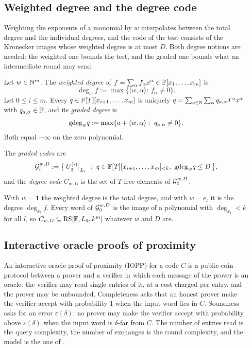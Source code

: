 \subsection{Weighted degree and the degree code}\label{sec:wdeg}

Weighting the exponents of a monomial by $w$ interpolates between the total degree and the
individual degrees, and the code of the test consists of the Kronecker images whose weighted
degree is at most $D$. Both degree notions are needed: the weighted one bounds the test, and
the graded one bounds what an intermediate round may send.

\begin{definition}\label{def:wdeg}
Let $w\in\mathbb{N}^m$. The \emph{weighted degree} of $f=\sum_\alpha f_\alpha x^\alpha\in\mathbb{F}[x_1,\dots,x_m]$ is
\[
\deg_w f:=\max\{\langle w,\alpha\rangle:\ f_\alpha\ne0\}.
\]
Let $0\le i\le m$. Every $q\in\mathbb{F}[T][x_{i+1},\dots,x_m]$ is uniquely
$q=\sum_{a\in\mathbb{N}}\sum_\alpha q_{a,\alpha}T^ax^\alpha$ with $q_{a,\alpha}\in\mathbb{F}$, and its
\emph{graded degree} is
\[
\mathrm{gdeg}_w q:=\max\{a+\langle w,\alpha\rangle:\ q_{a,\alpha}\ne0\}.
\]
Both equal $-\infty$ on the zero polynomial.
\end{definition}

\begin{definition}\label{def:graded}
The \emph{graded codes} are
\[
\Gc_i^{w,D}:=\big\{\,U^{(i)}_q\big|_{L_i}\ :\ q\in\F[T][x_{i+1},\dots,x_m]_{<k},\ \gdeg_w q\le D\,\big\},
\]
and the \emph{degree code} $C_{w,D}$ is the set of $T$-free elements of $\mathcal{G}_0^{w,D}$.
\end{definition}

With $w=\mathbf 1$ the weighted degree is the total degree, and with $w=e_l$ it is the
degree $\deg_{x_l}f$. Every word of $\mathcal{G}_0^{w,D}$ is the image of a polynomial with
$\deg_{x_l}<k$ for all $l$, so $C_{w,D}\subseteq\mathrm{RS}[\mathbb{F},L_0,k^m]$ whatever $w$ and $D$ are.

\subsection{Interactive oracle proofs of proximity}\label{sec:iop}

An interactive oracle proof of proximity (IOPP) for a code $C$ is a public-coin protocol
between a prover and a verifier in which each message of the prover is an oracle: the
verifier may read single entries of it, at a cost charged per entry, and the prover may be
unbounded. Completeness asks that an honest prover make the verifier accept with probability
$1$ when the input word lies in $C$. Soundness asks for an error $\varepsilon(\delta)$: no
prover may make the verifier accept with probability above $\varepsilon(\delta)$ when the input
word is $\delta$-far from $C$. The number of entries read is the query complexity,
the number of exchanges is the round complexity, and the model is the one of
\cite{BCS16,RRR16}.

